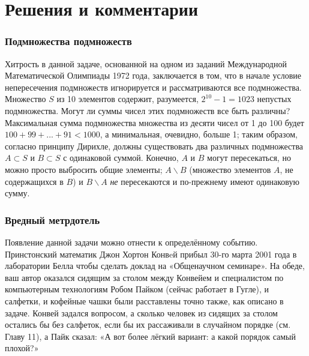 ﻿\section*{Решения и комментарии}

\subsubsection*{Подмножества подмножеств}%

Хитрость в данной задаче, основанной на одном из заданий Международной Математической Олимпиады 1972 года, заключается в том, что в начале условие непересечения подмножеств игнорируется и рассматриваются все подмножества.
Множество $S$ из 10 элементов содержит, разумеется, $2^{10} - 1 = 1023$ непустых подмножества.
Могут ли суммы чисел этих подмножеств все быть различны?
Максимальная сумма подмножества множества из десяти чисел от 1 до 100 будет 
$100+99+...+91<1000$, а минимальная, очевидно, больше 1; таким образом, согласно принципу Дирихле, должны существовать два различных подмножества $A\subset S$ и $B\subset S$ 
с одинаковой суммой.
Конечно, $A$ и $B$ могут пересекаться, но можно просто выбросить общие элементы;
$A\backslash B$ (множество элементов $A$, не содержащихся в $B$) и $B\backslash A$ \emph{не} пересекаются и по-прежнему имеют одинаковую сумму.\heart

\subsubsection*{Вредный метрдотель}%

Появление данной задачи можно отнести к определённому событию.
Принстонский математик Джон Хортон Конвeй %
прибыл 30-го марта 2001 года в лаборатории Белла %
чтобы сделать доклад на «Общенаучном семинаре». %
На обеде, ваш автор оказался сидящим за столом между Конвейем и специалистом по компьютерным технологиям Робом Пайком %
(сейчас работает в Гугле), и салфетки, и кофейные чашки были расставлены точно также, как описано в задаче.
Конвей задался вопросом, а сколько человек из
сидящих за столом остались бы без салфеток, если бы их рассаживали в случайном порядке (см. Главу 11), а Пайк сказал: «А вот более лёгкий вариант: а какой порядок самый плохой?»

\bigskip

